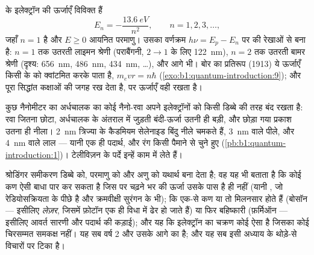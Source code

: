 \begin{proposition}[हाइड्रोजन परमाणु]\label{prop:b1:quantum-introduction:hydrogen}
 के इलेक्ट्रॉन की ऊर्जाएँ विविक्त हैं
\[
E_n = -\frac{\qty{13.6}{eV}}{n^2} , \qquad n = 1, 2, 3, \ldots ,
\]
जहाँ $n = 1$  है और $E \geq 0$ आयनित परमाणु। उसका वर्णक्रम
$h\nu = E_p - E_n$ पर की रेखाओं से बना है: $n = 1$ तक उतरती लाइमन श्रेणी
(पराबैंगनी, $2 \to 1$ के लिए \qty{122}{nm}), $n = 2$ तक उतरती बामर श्रेणी
(दृश्य: \qty{656}{nm}, \qty{486}{nm}, \qty{434}{nm}, \ldots),
और आगे भी। बोर का प्रतिरूप (1913) ये ऊर्जाएँ किसी  के  को क्वांटमित करके पाता है, $m_evr = n\hbar$
(\cref{exo:b1:quantum-introduction:9}); और पूरा सिद्धांत कक्षाओं की जगह
 रख देता है, पर ऊर्जाएँ वही रखता है।
\end{proposition}
\admitted

\begin{example}[आकार से रंग: क्वांटम बिंदु]\label{ex:b1:quantum-introduction:dot}
कुछ नैनोमीटर का अर्धचालक का कोई नैनो-रवा अपने इलेक्ट्रॉनों को किसी डिब्बे
की तरह बंद रखता है: रवा जितना छोटा, अर्धचालक के अंतराल में जुड़ती बंदी-ऊर्जा
उतनी ही बड़ी, और छोड़ा गया प्रकाश उतना ही नीला। \qty{2}{nm} त्रिज्या के
कैडमियम सेलेनाइड बिंदु नीले चमकते हैं, \qty{3}{nm} वाले पीले, और
\qty{4}{nm} वाले लाल --- यानी एक ही पदार्थ, और रंग किसी पैमाने से चुने हुए
(\cref{pb:b1:quantum-introduction:1})। टेलीविज़न के पर्दे इन्हें काम में लेते हैं।
\end{example}

\begin{remark}[बाकी सिद्धांत क्या जोड़ता है]\label{rem:b1:quantum-introduction:rest}
श्रोडिंगर समीकरण डिब्बे को, परमाणु को और अणु को यथार्थ बना देता है; वह यह
भी बताता है कि कोई कण ऐसी बाधा पार कर सकता है जिस पर चढ़ने भर की ऊर्जा
उसके पास है ही नहीं (यानी \emph{}, जो रेडियोसक्रियता के पीछे
है और क्रमवीक्षी सुरंगन  के भी); कि एक-से कण या तो मिलनसार होते
हैं (बोसॉन --- इसीलिए \emph{लेज़र}, जिसमें फ़ोटॉन एक ही विधा में ढेर हो जाते
हैं) या फिर बहिष्कारी (फ़र्मिऑन --- इसीलिए आवर्त सारणी और पदार्थ की
कड़ाई); और यह कि इलेक्ट्रॉन का चक्रण कोई ऐसा  है जिसका कोई
चिरसम्मत समकक्ष नहीं। यह सब वर्ष 2 और उसके आगे का है; और यह सब इसी अध्याय
के थोड़े-से विचारों पर टिका है।
\end{remark}

